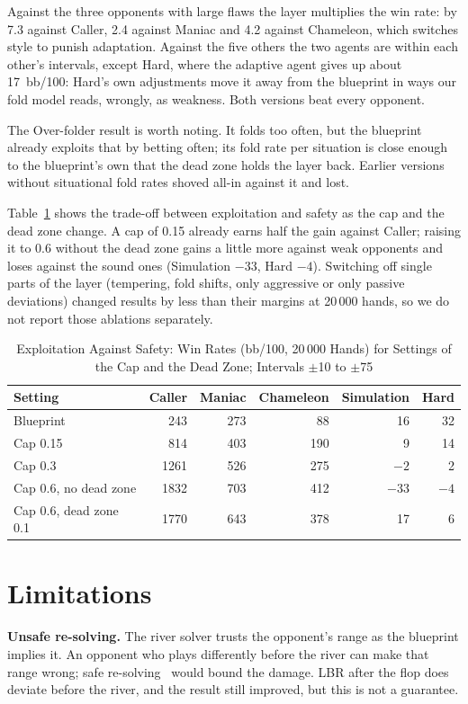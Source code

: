 \documentclass{ieeeaccess}
\newcommand{\bbh}{bb/100}
\begin{document}
Against the three opponents with large flaws the layer multiplies the win rate: by 7.3 against
Caller, 2.4 against Maniac and 4.2 against Chameleon, which switches style to punish adaptation.
Against the five others the two agents are within each other's intervals, except Hard, where the
adaptive agent gives up about 17~\bbh: Hard's own adjustments move it away from the blueprint
in ways our fold model reads, wrongly, as weakness. Both versions beat every opponent.

The Over-folder result is worth noting. It folds too often, but the blueprint already exploits
that by betting often; its fold rate per situation is close enough to the blueprint's own that the
dead zone holds the layer back. Earlier versions without situational fold rates shoved all-in
against it and lost.

Table~\ref{tab:tradeoff} shows the trade-off between exploitation and safety as the cap and the
dead zone change. A cap of 0.15 already earns half the gain against Caller; raising it to 0.6
without the dead zone gains a little more against weak opponents and loses against the sound
ones (Simulation $-33$, Hard $-4$). Switching off single parts of the layer (tempering, fold
shifts, only aggressive or only passive deviations) changed results by less than their margins
at 20\,000 hands, so we do not report those ablations separately.

\begin{table}[t]
\caption{Exploitation Against Safety: Win Rates (\bbh, 20\,000 Hands) for Settings of the
Cap and the Dead Zone; Intervals $\pm$10 to $\pm$75}
\label{tab:tradeoff}
\centering
\setlength{\tabcolsep}{4pt}
\begin{tabular}{lrrrrr}
\hline
Setting & Caller & Maniac & Chameleon & Simulation & Hard \\
\hline
Blueprint & 243 & 273 & 88 & 16 & 32 \\
Cap 0.15 & 814 & 403 & 190 & 9 & 14 \\
Cap 0.3 & 1261 & 526 & 275 & $-2$ & 2 \\
Cap 0.6, no dead zone & 1832 & 703 & 412 & $-33$ & $-4$ \\
Cap 0.6, dead zone 0.1 & 1770 & 643 & 378 & 17 & 6 \\
\hline
\end{tabular}
\end{table}

\section{Limitations}
\label{sec:limits}
\textbf{Unsafe re-solving.} The river solver trusts the opponent's range as the blueprint
implies it. An opponent who plays differently before the river can make that range wrong; safe
re-solving~\cite{brown2018} would bound the damage. LBR after the flop does deviate before the
river, and the result still improved, but this is not a guarantee.
\end{document}
